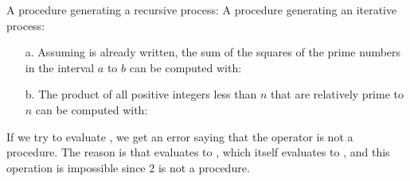\begin{exe}[1.33]
    A  procedure generating a recursive process:
    A  procedure generating an iterative process:
    \begin{itemize}
        \item[a.] Assuming  is already written, the sum of the 
            squares of the prime numbers in the interval $a$ to $b$ can be 
            computed with:
        \item[b.] The product of all positive integers less than $n$ that are 
            relatively prime to $n$ can be computed with:
    \end{itemize}
\end{exe}

\begin{exe}[1.34]
    If we try to evaluate , we get an error saying that the operator 
    is not a procedure. The reason is that  evaluates to
    , which itself evaluates to , and this operation is 
    impossible since 2 is not a procedure.
\end{exe}

